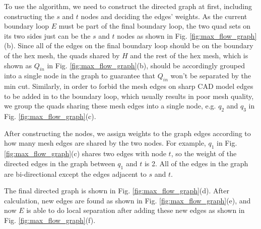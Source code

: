 \documentclass[final,5p,times,twocolumn]{elsarticle}
\begin{document}
To use the algorithm, we need to construct the directed graph at first, including constructing the $s$ and $t$ nodes and deciding the edges' weights. As the current boundary loop $E$ must be part of the final boundary loop, the two quad sets on its two sides just can be the $s$ and $t$ nodes as shown in Fig. \ref{fig:max_flow_graph}(b). Since all of the edges on the final boundary loop should be on the boundary of the hex mesh, the quads shared by $H$ and the rest of the hex mesh, which is shown as $Q_{in}$ in Fig. \ref{fig:max_flow_graph}(b), should be accordingly grouped into a single node in the graph to guarantee that $Q_{in}$ won't be separated by the min cut. Similarly, in order to forbid the mesh edges on sharp CAD model edges to be added in to the boundary loop, which usually results in poor mesh quality, we group the quads sharing these mesh edges into a single node, e.g. $q_2$ and $q_3$ in Fig. \ref{fig:max_flow_graph}(c).

After constructing the nodes, we assign weights to the graph edges according to how many mesh edges are shared by the two nodes. For example, $q_1$ in Fig. \ref{fig:max_flow_graph}(c) shares two edges with node $t$, so the weight of the directed edges in the graph between $q_1$ and $t$ is 2. All of the edges in the graph are bi-directional except the edges adjacent to $s$ and $t$.

The final directed graph is shown in Fig. \ref{fig:max_flow_graph}(d). After calculation, new edges are found as shown in Fig. \ref{fig:max_flow_graph}(e), and now $E$ is able to do local separation after adding these new edges as shown in  Fig. \ref{fig:max_flow_graph}(f).
\end{document}

